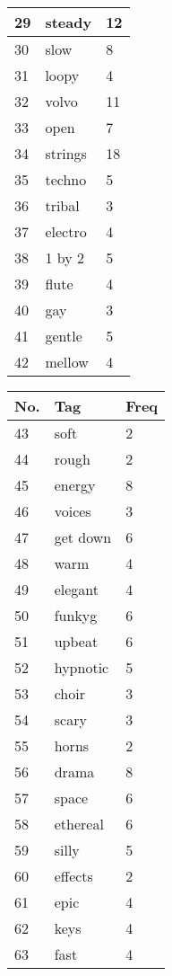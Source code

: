 \begin{appendices}
\begin{tabular}{| p{} | p{} | p{}|}
\hline
29 & steady & 12\\
\hline
30 & slow & 8\\
\hline
31 & loopy & 4\\
\hline
32 & volvo & 11\\
\hline
33 & open & 7\\
\hline
34 & strings & 18\\
\hline
35 & techno & 5\\
\hline
36 & tribal & 3\\
\hline
37 & electro & 4\\
\hline
38 & 1 by 2 & 5\\
\hline
39 & flute & 4\\
\hline
40 & gay & 3\\
\hline
41 & gentle & 5\\
\hline
42 & mellow & 4\\
\hline
\end{tabular}
\quad
\begin{tabular}{| p{} | p{} | p{}|}
\hline
\textbf{No.} & \textbf{Tag} & \textbf{Freq}\\
\hline
43 & soft & 2\\
\hline
44 & rough & 2\\
\hline
45 & energy & 8\\
\hline
46 & voices & 3\\
\hline
47 & get down & 6\\
\hline
48 & warm & 4\\
\hline
49 & elegant & 4\\
\hline
50 & funkyg & 6\\
\hline
51 & upbeat & 6\\
\hline
52 & hypnotic & 5\\
\hline 
53 & choir & 3\\
\hline
54 & scary & 3\\
\hline 
55 & horns & 2\\
\hline
56 & drama & 8\\
\hline
57 & space & 6\\
\hline
58 & ethereal & 6\\
\hline
59 & silly & 5\\
\hline
60 & effects & 2\\
\hline
61 & epic & 4\\
\hline
62 & keys & 4\\
\hline
63 & fast & 4\\
\hline
\end{tabular}
\clearpage


\end{appendices}
